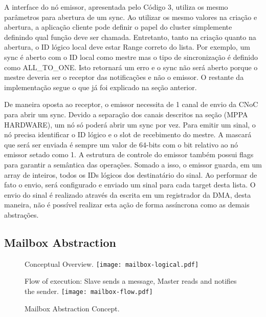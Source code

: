 				A interface do nó emissor, apresentada pelo Código 3, utiliza os mesmo parâmetros para abertura de um sync.
				Ao utilizar os mesmo valores na criação e abertura, a aplicação cliente pode definir o papel do cluster simplemente definindo qual função deve ser chamada.
				Entretanto, tanto na criação quanto na abertura, o ID lógico local deve estar Range correto do lista.
				Por exemplo, um sync é aberto com o ID local como mestre mas o tipo de sincronização é definido como ALL\_TO\_ONE.
				Isto retornará um erro e o sync não será aberto porque o mestre deveria ser o receptor das notificações e não o emissor.
				O restante da implementação segue o que já foi explicado na seção anterior.

				De maneira oposta ao receptor, o emissor necessita de 1 canal de envio da CNoC para abrir um sync.
				Devido a separação dos canais descritos na seção (MPPA HARDWARE), um nó só poderá abrir um sync por vez.
				Para emitir um sinal, o nó precisa identificar o ID lógico e o slot de recebimento do mestre.
				A mascará que será ser enviada é sempre um valor de 64-bits com o bit relativo ao nó emissor setado como 1.
				A estrutura de controle do emissor também possui flags para garantir a semântica das operações.
				Somado a isso, o emissor guarda, em um array de inteiros, todos os IDs lógicos dos destinatário do sinal.
				Ao performar de fato o envio, será configurado e enviado um sinal para cada target desta lista.
				O envio do sinal é realizado através da escrita em um registrador da DMA, desta maneira, não é possível realizar esta ação de forma assíncrona como as demais abstrações.

		\subsection{Mailbox Abstraction}
		\label{sec.mailbox-abs}

			\begin{figure}[!tb]
				\centering%
				\caption{Mailbox Abstraction Concept.}%
				\label{fig:conpt_mailbox}%

					{Conceptual Overview.}%
					{\texttt{[image: mailbox-logical.pdf]}}%

				\hfill

					{Flow of execution: Slave sends a message, Master reads and notifies the sender.}%
					{\texttt{[image: mailbox-flow.pdf]}}%

			\end{figure}

